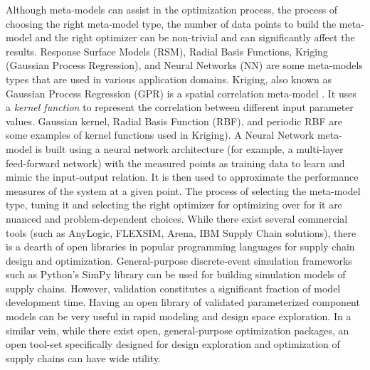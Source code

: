 Although meta-models can assist in the optimization process, the process of choosing the right meta-model type, the number of data points to build the meta-model and the right optimizer can be non-trivial and can significantly affect the results.  Response Surface Models (RSM), Radial Basis Functions, Kriging (Gaussian Process Regression), and Neural Networks (NN) are some meta-models types that are used in various application domains.   Kriging, also known as Gaussian Process Regression\textbf{ }(GPR) is a spatial correlation meta-model \cite{kleijnen2009kriging,ankenman2008stochastic}. It uses a \textit{kernel function} to represent the  correlation between different input parameter values. Gaussian kernel, Radial Basis Function (RBF), and periodic RBF are some examples of kernel functions used in Kriging). A Neural Network meta-model is built using a neural network architecture (for example, a multi-layer feed-forward network) with the measured points as training data to learn and mimic the input-output relation. It is then used to approximate the performance measures of the system at a given point. The process of selecting the meta-model type, tuning it and selecting the right optimizer for optimizing over for it are nuanced and problem-dependent choices. 
%
While there exist several commercial tools (such as AnyLogic, FLEXSIM, Arena, IBM Supply Chain solutions), there is a dearth of open libraries in popular programming languages for supply chain design and optimization.  General-purpose discrete-event simulation frameworks such as Python's SimPy library \cite{SimPy} can be used for building simulation models of supply chains. However, validation constitutes a significant fraction of model development time. Having an open library of  validated parameterized component models can be very useful in rapid modeling and design space exploration.  In a similar vein, while there exist open, general-purpose optimization packages, an open tool-set specifically designed for design exploration and optimization of supply chains can have wide utility.

